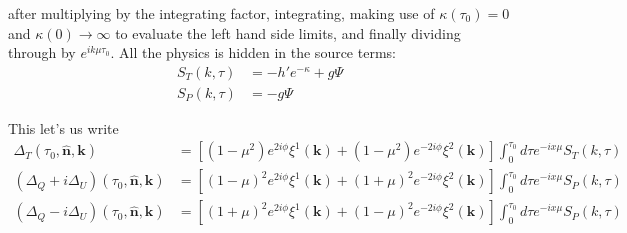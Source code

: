 \documentclass[a4paper,10pt]{article}
\renewcommand{\v}[1]{\mathbf{#1}}
\newcommand{\unit}[1]{\hat{\v{#1}}}
\begin{document}
after multiplying by the integrating factor, integrating, making use of $\kappa(\tau_0)=0$ and $\kappa(0)\rightarrow \infty$ to evaluate the left hand side limits, and finally dividing through by $e^{ik\mu\tau_0}$. All the physics is hidden in the source terms:
\begin{equation}\begin{split}
S_T(k,\tau) &= -h'e^{-\kappa}+g\Psi\\
S_P(k,\tau) &= -g\Psi
\end{split}\end{equation}

This let's us write
\begin{equation}\begin{split}
\Delta_T(\tau_0,\unit{n},\v{k}) &= [(1-\mu^2) e^{2i\phi} \xi^1(\v{k})+(1-\mu^2) e^{-2i\phi} \xi^2(\v{k})]\int_0^{\tau_0}d\tau e^{-ix\mu}S_T(k,\tau)\\
(\Delta_Q+i\Delta_U)(\tau_0,\unit{n},\v{k}) &=[(1-\mu)^2 e^{2i\phi} \xi^1(\v{k})+(1+\mu)^2 e^{-2i\phi} \xi^2(\v{k})]\int_0^{\tau_0}d\tau e^{-ix\mu}S_P(k,\tau)\\
(\Delta_Q-i\Delta_U)(\tau_0,\unit{n},\v{k}) &=[(1+\mu)^2 e^{2i\phi} \xi^1(\v{k})+(1-\mu)^2 e^{-2i\phi} \xi^2(\v{k})]\int_0^{\tau_0}d\tau e^{-ix\mu}S_P(k,\tau)
\end{split}\end{equation}
\end{document}
